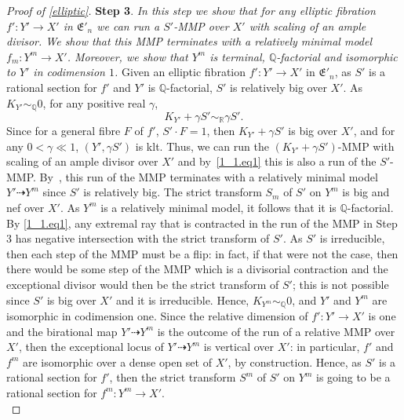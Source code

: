 \documentclass{amsart}[12pt,a4paper]
\theoremstyle{definition}
\begin{document}
\begin{proof}[Proof of \ref{elliptic}]
{\bf Step 3}. {\it In this step we show that for any elliptic fibration $f'\colon Y' \to X'$ in $\mathfrak{E}'_n$ we can run a $S'$-MMP over $X'$ with scaling of an ample divisor. 
We show that this MMP terminates with a relatively minimal model $f_m \colon Y^m \to X'$.
Moreover, we show that $Y^m$ is terminal, $\mathbb{Q}$-factorial and isomorphic to $Y'$ in codimension $1$.
}
\newline
Given an elliptic fibration $f'\colon Y' \to X'$ in $\mathfrak{E}'_n$, as $S'$ is a rational section for $f'$ and $Y'$ is $\mathbb{Q}$-factorial, $S'$ is relatively big over $X'$.
As $K_{Y'} \sim_\mathbb{Q} 0$, for any positive real $\gamma$, 
\begin{equation}
\label{1_1.eq1}
K_{Y'} + \gamma S' \sim_\mathbb{R} \gamma S'.
\end{equation}
Since for a general fibre $F$ of $f'$, $S'\cdot F=1$, then $K_{Y'} + \gamma S'$ is big over $X'$, and for any $0 < \gamma \ll 1$, $(Y', \gamma S')$ is klt.
Thus, we can run the $(K_{Y'} + \gamma S')$-MMP with scaling of an ample divisor over $X'$ and by~\eqref{1_1.eq1} this is also a run of the $S'$-MMP.
By~\cite[Corollary 1.4.2]{BCHM}, this run of the MMP terminates with a relatively minimal model $Y' \dashrightarrow Y^m$ since $S'$ is relatively big.
The strict transform $S_m$ of $S'$ on $Y^m$ is big and nef over $X'$.
As $Y^m$ is a relatively minimal model, it follows that it is $\mathbb{Q}$-factorial. 
\\
By \eqref{1_1.eq1}, any extremal ray that is contracted in the run of the MMP in Step 3 has negative intersection with the strict transform of $S'$.
As $S'$ is irreducible, then each step of the MMP must be a flip:
in fact, if that were not the case, then there would be some step of the MMP which is a divisorial contraction and the exceptional divisor would then be the strict transform of $S'$; 
this is not possible since $S'$ is big over $X'$ and it is irreducible.
Hence, $K_{Y^m}\sim
_\mathbb{Q} 0$, and $Y'$ and $Y^m$ are isomorphic in codimension one.
Since the relative dimension of $f' \colon Y' \to X'$ is one and the birational map $Y' \dashrightarrow Y^m$ is the outcome of the run of a relative MMP over $X'$, then the exceptional locus of $Y' \dashrightarrow Y^m$ is vertical over $X'$:
in particular, $f'$ and $f^m$ are isomorphic over a dense open set of $X'$, by construction. 
Hence, as $S'$ is a rational section for $f'$, then the strict transform $S^m$ of $S'$ on $Y^m$ is going to be a rational section for $f^m \colon Y^m \to X'$.
\\


\end{proof}
\end{document}
